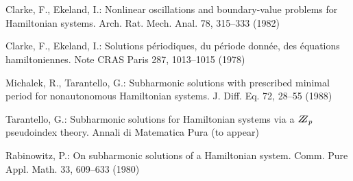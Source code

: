 \documentclass{llncs}
\begin{document}
\section{}

%
\begin{thebibliography}{5}
%
Clarke, F., Ekeland, I.:
Nonlinear oscillations and
boundary-value problems for Hamiltonian systems.
Arch. Rat. Mech. Anal. 78, 315--333 (1982)

Clarke, F., Ekeland, I.:
Solutions p\'{e}riodiques, du
p\'{e}riode donn\'{e}e, des \'{e}quations hamiltoniennes.
Note CRAS Paris 287, 1013--1015 (1978)

Michalek, R., Tarantello, G.:
Subharmonic solutions with prescribed minimal
period for nonautonomous Hamiltonian systems.
J. Diff. Eq. 72, 28--55 (1988)

Tarantello, G.:
Subharmonic solutions for Hamiltonian
systems via a $\bbbz_{p}$ pseudoindex theory.
Annali di Matematica Pura (to appear)

Rabinowitz, P.:
On subharmonic solutions of a Hamiltonian system.
Comm. Pure Appl. Math. 33, 609--633 (1980)

\end{thebibliography}
\end{document}
